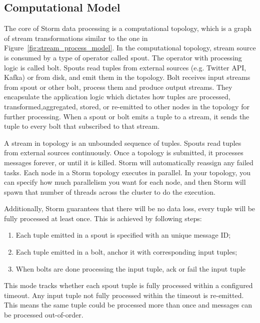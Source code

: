 \subsection{Computational Model}

The core of Storm data processing is a computational topology, which is a graph of stream transformations similar to the one in Figure~\ref{fig:stream_process_model}. In the computational topology, stream source is consumed by a type of operator called spout. The operator with processing logic is called bolt. Spouts read tuples from external sources (e.g. Twitter API, Kafka) or from disk, and emit them in the topology. Bolt receives input streams from spout or other bolt, process them and produce output streams. They encapsulate the application logic which dictates how tuples are processed, transformed,aggregated, stored, or re-emitted to other nodes in the topology for further processing. When a spout or bolt emits a tuple to a stream, it sends the tuple to every bolt that subscribed to that stream.

A stream in topology is an unbounded sequence of tuples. Spouts read tuples from external sources continuously. Once a topology is submitted, it processes messages forever, or until it is killed. Storm will automatically reassign any failed tasks. Each node in a Storm topology executes in parallel. In your topology, you can specify how much parallelism you want for each node, and then Storm will spawn that number of threads across the cluster to do the execution. 

Additionally, Storm guarantees that there will be no data loss, every tuple will be fully processed at least once. This is achieved by following steps:

\begin{enumerate}
\item Each tuple emitted in a spout is specified with an unique message ID;
\item Each tuple emitted in a bolt, anchor it with corresponding input tuples; 
\item When bolts are done processing the input tuple, ack or fail the input tuple
\end{enumerate}

This mode tracks whether each spout tuple is fully processed within a configured timeout. Any input tuple not fully processed within the timeout is re-emitted. This means the same tuple could be processed more than once and messages can be processed out-of-order. 


